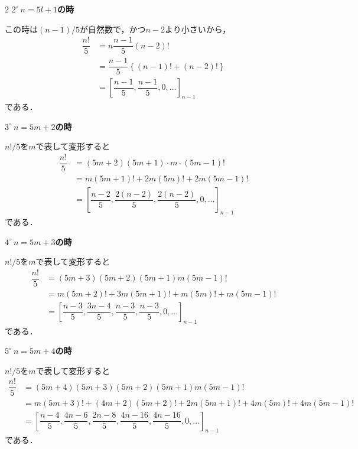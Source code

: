 \documentclass[../../main.tex]{subfiles}
\begin{document}
\begin{multicols}{2}
  \textbf{$2^{\circ} \ n=5l+1$の時}

  この時は$(n-1)/5$が自然数で，かつ$n-2$より小さいから，
  \begin{align}
    \dfrac{n!}{5}
    & = n\dfrac{n-1}{5}(n-2)!                                      \\
    & = \dfrac{n-1}{5} \left\{(n-1)! + (n-2)!\right\}              \\
    & = \left[\dfrac{n-1}{5}, \dfrac{n-1}{5}, 0, \dots\right]_{n-1}
  \end{align}
  である．

  \textbf{$3^{\circ} \ n=5m+2$の時}

  $n!/5$を$m$で表して変形すると
  \begin{align}
    \dfrac{n!}{5}
    & = (5m+2)(5m+1) \cdot m \cdot (5m-1)!                                             \\
    & = m(5m+1)! + 2m(5m)! + 2m(5m-1)!                                                 \\
    & = \left[\dfrac{n-2}{5}, \dfrac{2(n-2)}{5}, \dfrac{2(n-2)}{5}, 0, \dots\right]_{n-1}
  \end{align}
  である．

  \textbf{$4^{\circ} \ n=5m+3$の時}

  $n!/5$を$m$で表して変形すると
  \begin{align}
    \dfrac{n!}{5}
    & = (5m+3)(5m+2)(5m+1)m(5m-1)!                                                               \\
    & = m(5m+2)! + 3m(5m+1)! + m(5m)! + m(5m-1)!                                                 \\
    & = \left[\dfrac{n-3}{5}, \dfrac{3n-4}{5}, \dfrac{n-3}{5}, \dfrac{n-3}{5}, 0, \dots\right]_{n-1}
  \end{align}
  である．

  \textbf{$5^{\circ} \ n=5m+4$の時}

  $n!/5$を$m$で表して変形すると
  \begin{align}
    \dfrac{n!}{5} & = (5m+4)(5m+3)(5m+2)(5m+1)m(5m-1)!                                                                            \\
    & = m(5m+3)! + (4m+2)(5m+2)! + 2m(5m+1)! + 4m(5m)! + 4m(5m-1)!                                                  \\
    & = \left[\dfrac{n-4}{5}, \dfrac{4n-6}{5}, \dfrac{2n-8}{5}, \dfrac{4n-16}{5}, \dfrac{4n-16}{5},0,\dots \right]_{n-1}
  \end{align}
  である．


\end{multicols}
\end{document}
